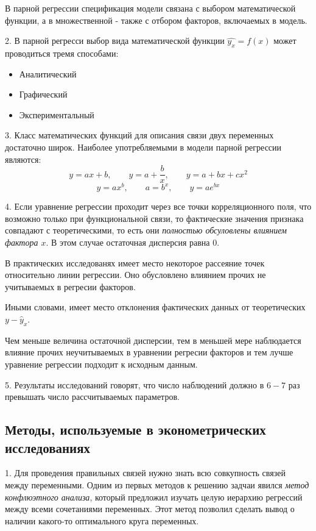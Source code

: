 \documentclass[aps,%
12pt,%
final,%
oneside,
onecolumn,%
musixtex, %
superscriptaddress,%
centertags]{article} %
\theoremstyle{plain}
\theoremstyle{definition}
\theoremstyle{remark}
\begin{document}
В парной регрессии спецификация модели связана с выбором математической функции, а в множественной - также с отбором факторов, включаемых в модель.

2. В парной регресси выбор вида математической функции $\hat{y_x} = f(x)$ может проводиться тремя способами:
\begin{itemize}
	\item Аналитический
	\item Графический
	\item Экспериментальный
\end{itemize}

3. Класс математических функций для описания связи двух переменных достаточно широк. Наиболее употребляемыми в модели парной регрессии являются:
$$y=ax+b,\qquad y=a+\frac{b}{x},\qquad y=a+bx+cx^2$$
$$y=ax^b, \qquad a=b^x, \qquad y=ae^{bx} $$

4. Если уравнение регрессии проходит через все точки корреляционного поля, что возможно только при функциональной связи, то фактические значения признака совпадают с теоретическими, то есть они \textit{полностью обсуловлены влиянием фактора $x$}. В этом случае остаточная дисперсия равна $0$.

В практических исследованях имеет место некоторое рассеяние точек относительно линии регрессии. Оно обусловлено влиянием прочих не учитываемых в регресии факторов. 

Иными словами, имеет место отклонения фактических данных от теоретических $y - \widehat{y}_x$.

Чем меньше величина остаточной дисперсии, тем в меньшей мере наблюдается влияние прочих неучитываемых в уравнении регресии факторов и тем лучше уравнение регрессии подходит к исходным данным.

5. Результаты исследований говорят, что число наблюдений должно в $6-7$ раз превышать число рассчитываемых параметров.
\newpage
\subsection{Методы, используемые в эконометрических исследованиях}

1. Для проведения правильных связей нужно знать всю совкупность связей между переменными. Одним из первых методов к решению задчаи явился \textit{метод конфлюэтного анализа}, который предложил изучать целую иерархию регрессий между всеми сочетаниями переменных. Этот метод позволил сделать вывод о наличии какого-то оптимального круга переменных.
\end{document}
